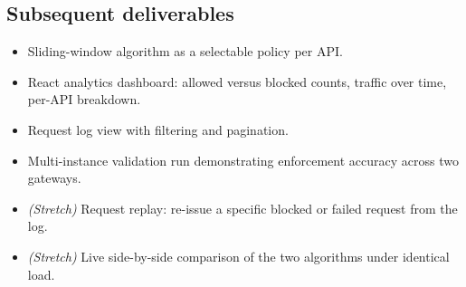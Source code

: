 \documentclass[11pt,a4paper]{article}
\begin{document}
\subsection{Subsequent deliverables}
\begin{itemize}[leftmargin=0.7cm]
    \item Sliding-window algorithm as a selectable policy per API.
    \item React analytics dashboard: allowed versus blocked counts, traffic
      over time, per-API breakdown.
    \item Request log view with filtering and pagination.
    \item Multi-instance validation run demonstrating enforcement accuracy
      across two gateways.
    \item \emph{(Stretch)} Request replay: re-issue a specific blocked or
      failed request from the log.
    \item \emph{(Stretch)} Live side-by-side comparison of the two algorithms
      under identical load.
\end{itemize}
\end{document}
